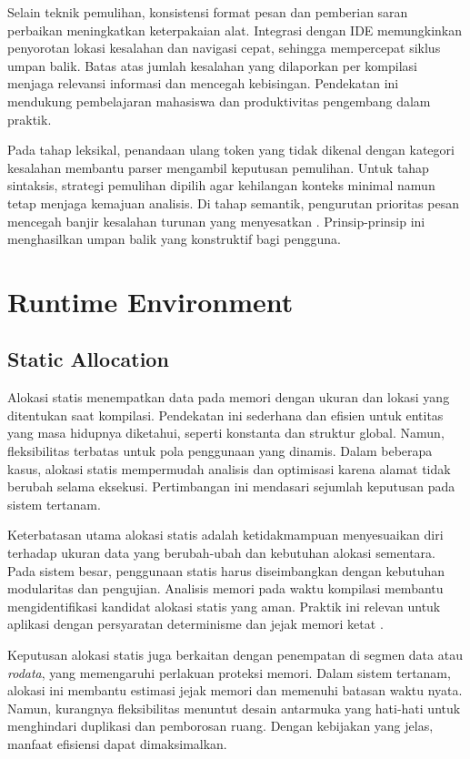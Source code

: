 \documentclass[../main.tex]{subfiles}
\begin{document}
Selain teknik pemulihan, konsistensi format pesan dan pemberian saran perbaikan meningkatkan keterpakaian alat. Integrasi dengan IDE memungkinkan penyorotan lokasi kesalahan dan navigasi cepat, sehingga mempercepat siklus umpan balik. Batas atas jumlah kesalahan yang dilaporkan per kompilasi menjaga relevansi informasi dan mencegah kebisingan. Pendekatan ini mendukung pembelajaran mahasiswa dan produktivitas pengembang dalam praktik.

Pada tahap leksikal, penandaan ulang token yang tidak dikenal dengan kategori kesalahan membantu parser mengambil keputusan pemulihan. Untuk tahap sintaksis, strategi pemulihan dipilih agar kehilangan konteks minimal namun tetap menjaga kemajuan analisis. Di tahap semantik, pengurutan prioritas pesan mencegah banjir kesalahan turunan yang menyesatkan \citep{Mogensen2010}. Prinsip-prinsip ini menghasilkan umpan balik yang konstruktif bagi pengguna.

\section{Runtime Environment}
\subsection{Static Allocation}
Alokasi statis menempatkan data pada memori dengan ukuran dan lokasi yang ditentukan saat kompilasi. Pendekatan ini sederhana dan efisien untuk entitas yang masa hidupnya diketahui, seperti konstanta dan struktur global. Namun, fleksibilitas terbatas untuk pola penggunaan yang dinamis. Dalam beberapa kasus, alokasi statis mempermudah analisis dan optimisasi karena alamat tidak berubah selama eksekusi. Pertimbangan ini mendasari sejumlah keputusan pada sistem tertanam.

Keterbatasan utama alokasi statis adalah ketidakmampuan menyesuaikan diri terhadap ukuran data yang berubah-ubah dan kebutuhan alokasi sementara. Pada sistem besar, penggunaan statis harus diseimbangkan dengan kebutuhan modularitas dan pengujian. Analisis memori pada waktu kompilasi membantu mengidentifikasi kandidat alokasi statis yang aman. Praktik ini relevan untuk aplikasi dengan persyaratan determinisme dan jejak memori ketat \citep{WikiMemory}.

Keputusan alokasi statis juga berkaitan dengan penempatan di segmen data atau \emph{rodata}, yang memengaruhi perlakuan proteksi memori. Dalam sistem tertanam, alokasi ini membantu estimasi jejak memori dan memenuhi batasan waktu nyata. Namun, kurangnya fleksibilitas menuntut desain antarmuka yang hati-hati untuk menghindari duplikasi dan pemborosan ruang. Dengan kebijakan yang jelas, manfaat efisiensi dapat dimaksimalkan.
\end{document}
